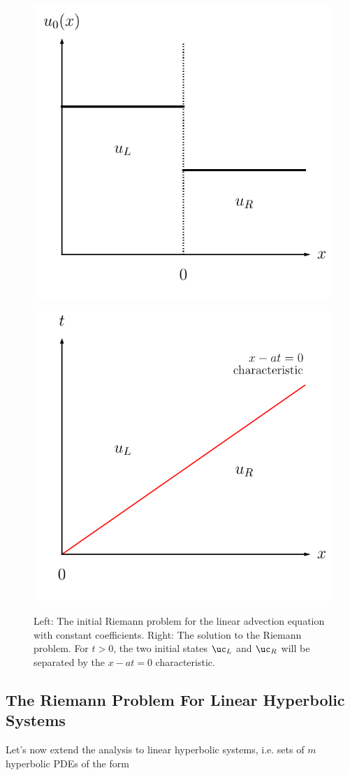 \begin{figure}[H]
    \centering
	\includegraphics[width=.4\linewidth]{./figures/FV/riemann_problem_linear_advection.pdf}%
	\includegraphics[width=.4\linewidth]{./figures/FV/riemann_solution_linear_advection.pdf}%
	\caption[Riemann problem and solution for the linear advection equation with constant
coefficients]{
    Left: The initial Riemann problem for the linear advection equation with constant
coefficients. Right: The solution to the Riemann problem. For $t > 0$, the two initial states
$\uc_L$ and $\uc_R$ will be separated by the $x - at = 0$ characteristic.
	}
    \label{fig:riemann-linear-advection}
\end{figure}













\subsection{The Riemann Problem For Linear Hyperbolic Systems}


Let's now extend the analysis to linear hyperbolic systems, i.e. sets of $m$ hyperbolic PDEs of the
form

